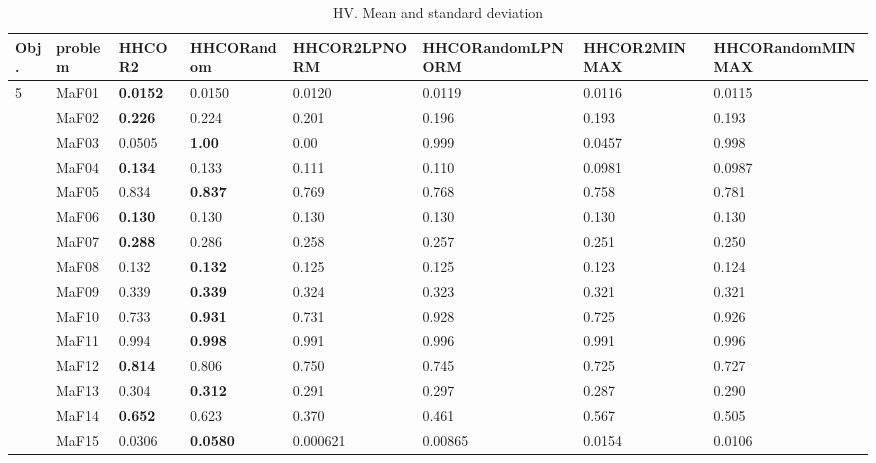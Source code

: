 \documentclass[]{article}
\begin{document}
\begin{landscape}
\begin{table}
\caption{HV. Mean and standard deviation}
\label{table:mean.HV}
\centering
\begin{footnotesize}
\begin{tabular}{|l|l|l|l|l|l|l|l|}
\hline
Obj. & problem  & HHCOR2 & HHCORandom & HHCOR2LPNORM & HHCORandomLPNORM & HHCOR2MINMAX & HHCORandomMINMAX \\ \hline

\multirow{15}{*}{5} & MaF01 & \cellcolor{gray95} {\bf 0.0152} & \cellcolor{gray95} 0.0150 & 0.0120 & 0.0119 & 0.0116 & 0.0115\\
 & MaF02 & \cellcolor{gray95} {\bf 0.226} & \cellcolor{gray95} 0.224 & 0.201 & 0.196 & 0.193 & 0.193\\
 & MaF03 & 0.0505 & \cellcolor{gray95} {\bf 1.00} & 0.00 & \cellcolor{gray95} 0.999 & 0.0457 & 0.998\\
 & MaF04 & \cellcolor{gray95} {\bf 0.134} & \cellcolor{gray95} 0.133 & 0.111 & 0.110 & 0.0981 & 0.0987\\
 & MaF05 & \cellcolor{gray95} 0.834 & \cellcolor{gray95} {\bf 0.837} & 0.769 & 0.768 & 0.758 & 0.781\\
 & MaF06 & \cellcolor{gray95} {\bf 0.130} & \cellcolor{gray95} 0.130 & \cellcolor{gray95} 0.130 & \cellcolor{gray95} 0.130 & 0.130 & 0.130\\
 & MaF07 & \cellcolor{gray95} {\bf 0.288} & \cellcolor{gray95} 0.286 & 0.258 & 0.257 & 0.251 & 0.250\\
 & MaF08 & \cellcolor{gray95} 0.132 & \cellcolor{gray95} {\bf 0.132} & 0.125 & 0.125 & 0.123 & 0.124\\
 & MaF09 & \cellcolor{gray95} 0.339 & \cellcolor{gray95} {\bf 0.339} & 0.324 & 0.323 & 0.321 & 0.321\\
 & MaF10 & 0.733 & \cellcolor{gray95} {\bf 0.931} & 0.731 & \cellcolor{gray95} 0.928 & 0.725 & \cellcolor{gray95} 0.926\\
 & MaF11 & 0.994 & \cellcolor{gray95} {\bf 0.998} & 0.991 & \cellcolor{gray95} 0.996 & 0.991 & 0.996\\
 & MaF12 & \cellcolor{gray95} {\bf 0.814} & \cellcolor{gray95} 0.806 & 0.750 & 0.745 & 0.725 & 0.727\\
 & MaF13 & \cellcolor{gray95} 0.304 & \cellcolor{gray95} {\bf 0.312} & 0.291 & 0.297 & 0.287 & 0.290\\
 & MaF14 & \cellcolor{gray95} {\bf 0.652} & \cellcolor{gray95} 0.623 & 0.370 & 0.461 & \cellcolor{gray95} 0.567 & 0.505\\
 & MaF15 & \cellcolor{gray95} 0.0306 & \cellcolor{gray95} {\bf 0.0580} & 0.000621 & 0.00865 & 0.0154 & 0.0106\\
\hline


\end{tabular}
\end{footnotesize}
\end{table}
\end{landscape}
\end{document}
